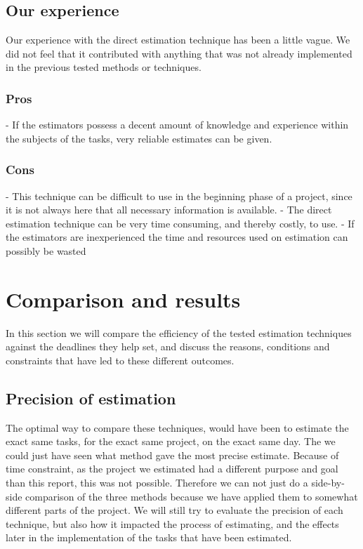 \subsection{Our experience}
Our experience with the direct estimation technique has been a little vague. We did not feel that it contributed with anything that was not already implemented in the previous tested methods or techniques. 

\subsubsection{Pros}
- If the estimators possess a decent amount of knowledge and experience within the subjects of the tasks, very reliable estimates can be given. 

\subsubsection{Cons}
- This technique can be difficult to use in the beginning phase of a project, since it is not always here that all necessary information is available.
- The direct estimation technique can be very time consuming, and thereby costly, to use.
- If the estimators are inexperienced the time and resources used on estimation can possibly be wasted


\section{Comparison and results}

In this section we will compare the efficiency of the tested estimation techniques against the deadlines they help set, and discuss the reasons, conditions and constraints that have led to these different outcomes.

\subsection{Precision of estimation}
The optimal way to compare these techniques, would have been to estimate the exact same tasks, for the exact same project, on the exact same day. The we could just have seen what method gave the most precise estimate. Because of time constraint, as the project we estimated had a different purpose and goal than this report, this was not possible. Therefore we can not just do a side-by-side comparison of the three methods because we have applied them to somewhat different parts of the project. We will still try to evaluate the precision of each technique, but also how it impacted the process of estimating, and the effects later in the implementation of the tasks that have been estimated. \\

